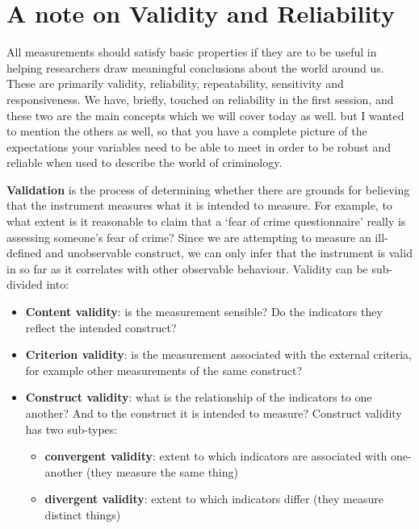 \documentclass[]{book}
\providecommand{\tightlist}{%
  \setlength{\itemsep}{0pt}\setlength{\parskip}{0pt}}
\theoremstyle{definition}
\theoremstyle{definition}
\theoremstyle{definition}
\theoremstyle{remark}
\begin{document}
\hypertarget{a-note-on-validity-and-reliability}{%
\section{A note on Validity and
Reliability}\label{a-note-on-validity-and-reliability}}

All measurements should satisfy basic properties if they are to be
useful in helping researchers draw meaningful conclusions about the
world around us. These are primarily validity, reliability,
repeatability, sensitivity and responsiveness. We have, briefly, touched
on reliability in the first session, and these two are the main concepts
which we will cover today as well. but I wanted to mention the others as
well, so that you have a complete picture of the expectations your
variables need to be able to meet in order to be robust and reliable
when used to describe the world of criminology.

\textbf{Validation} is the process of determining whether there are
grounds for believing that the instrument measures what it is intended
to measure. For example, to what extent is it reasonable to claim that a
`fear of crime questionnaire' really is assessing someone's fear of
crime? Since we are attempting to measure an ill-defined and
unobservable construct, we can only infer that the instrument is valid
in so far as it correlates with other observable behaviour. Validity can
be sub-divided into:

\begin{itemize}
\tightlist
\item
  \textbf{Content validity}: is the measurement sensible? Do the
  indicators they reflect the intended construct?
\item
  \textbf{Criterion validity}: is the measurement associated with the
  external criteria, for example other measurements of the same
  construct?
\item
  \textbf{Construct validity}: what is the relationship of the
  indicators to one another? And to the construct it is intended to
  measure? Construct validity has two sub-types:

  \begin{itemize}
  \tightlist
  \item
    \textbf{convergent validity}: extent to which indicators are
    associated with one-another (they measure the same thing)
  \item
    \textbf{divergent validity}: extent to which indicators differ (they
    measure distinct things)
  \end{itemize}
\end{itemize}
\end{document}
